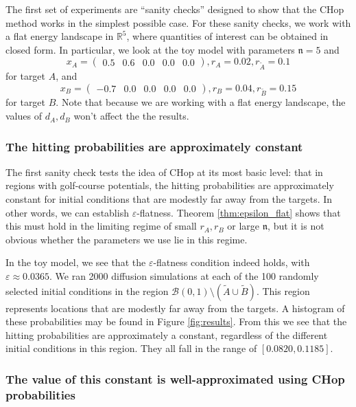 \documentclass[english, aip, jcp, priprint, graphicx,floatfix]{revtex4-1}
\theoremstyle{plain}
\theoremstyle{definition}
\theoremstyle{plain}
\newcommand{\dimension}{{\mathfrak{n}}}
\begin{document}
The first set of experiments are ``sanity checks'' designed to show that the CHop method works in the simplest possible case.  For these sanity checks, we work with a flat energy landscape in $\mathbb{R}^5$, where quantities of interest can be obtained in closed form.  In particular, we look at the toy model with parameters $\dimension = 5$ and
\begin{equation*}
x_A = \begin{pmatrix}%
0.5&0.6&0.0&0.0&0.0%
\end{pmatrix},
r_A = 0.02, r_{\tilde{A}} = 0.1
\end{equation*}
for target $A$, and
\begin{equation*}
x_B = \begin{pmatrix}%
-0.7&0.0&0.0&0.0&0.0%
\end{pmatrix},
r_B = 0.04, r_{\tilde{B}} = 0.15
\end{equation*}
for target $B$. Note that because we are working with a flat energy landscape, the values of $d_A, d_B$ won't affect the the results.

\subsubsection{The hitting probabilities are approximately constant}

The first sanity check tests the idea of CHop at its most basic level: that in regions with golf-course potentials, the hitting probabilities are approximately constant for initial conditions that are modestly far away from the targets. In other words, we can establish $\varepsilon$-flatness.  Theorem \ref{thm:epsilon_flat} shows that this must hold in the limiting regime of small $r_A,r_B$ or large $\dimension$, but it is not obvious whether the parameters we use lie in this regime.  

In the toy model, we see that the $\varepsilon$-flatness condition indeed holds, with $\varepsilon \approx 0.0365$.  We ran 2000 diffusion simulations at each of the 100 randomly selected initial conditions in the region $\mathcal{B}(0, 1) \setminus (\tilde{A} \cup \tilde{B})$. This region represents locations that are modestly far away from the targets.  A histogram of these probabilities may be found in Figure \ref{fig:results}.  From this we see that the hitting probabilities are approximately a constant, regardless of the different initial conditions in this region. They all fall in the range of $[0.0820, 0.1185]$.


\subsubsection{The value of this constant is well-approximated using CHop probabilities}
\end{document}
